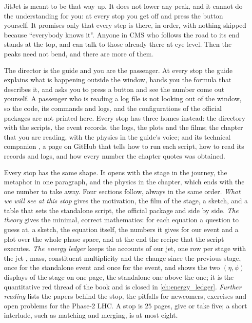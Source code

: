 JitJet is meant to be that way up. It does not lower any peak, and it
cannot do the understanding for you: at every stop you get off and press
the button yourself. It promises only that every step is there, in order,
with nothing skipped because ``everybody knows it''. Anyone in CMS who
follows the road to its end stands at the top, and can talk to those
already there at eye level. Then the peaks need not bend, and there are
more of them.

The director is the guide and you are the passenger. At every stop the guide
explains what is happening outside the window, hands you the formula that
describes it, and asks you to press a button and see the number come out
yourself. A passenger who is reading a log file is not looking out of the
window, so the code, its commands and logs, and the configurations of the
official packages are not printed here. Every stop has three homes instead:
the directory  with the scripts, the event records, the
logs, the plots and the films; the chapter 
that you are reading, with the physics in the guide's voice; and its
technical companion , a page on GitHub that
tells how to run each script, how to read its records and logs, and how
every number the chapter quotes was obtained.

Every stop has the same shape. It opens with the stage in the journey, the
metaphor in one paragraph, and the physics in the chapter, which ends with
the one number to take away. Four sections follow, always in the same
order. \emph{What we will see at this stop} gives the motivation, the film
of the stage, a sketch, and a table that sets the standalone script, the
official package and \CMSSW side by side. \emph{The theory} gives the
minimal, correct mathematics: for each equation a question to guess at, a
sketch, the equation itself, the numbers it gives for our event and a plot
over the whole phase space, and at the end the recipe that the script
executes. \emph{The energy ledger} keeps the accounts of our jet, one row
per stage with the jet \pt, mass, constituent multiplicity and the change
since the previous stage, once for the standalone event and once for the
\CMSSW event, and shows the two $(\eta,\phi)$ displays of the stage on one
page, the standalone one above the \CMSSW one; it is the
quantitative red thread of the book and is closed in
\cref{ch:energy_ledger}. \emph{Further reading} lists the papers behind the
stop, the pitfalls for newcomers, exercises and open problems for the
Phase-2 LHC. A stop is $25$ pages, give or take five; a short interlude,
such as matching and merging, is at most eight.

